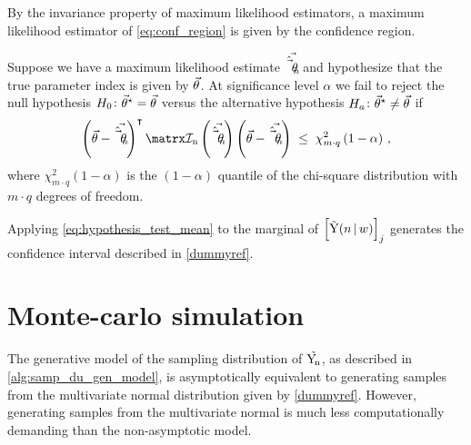 \documentclass[../main.tex]{subfiles}
\begin{document}
By the invariance property of maximum likelihood estimators, a maximum likelihood estimator of \cref{eq:conf_region} is given by the confidence region.
\begin{definition}
Suppose we have a maximum likelihood estimate $\vec{\hat{\vec{\theta}}_{n}}$ and hypothesize that the true parameter index is given by $\vec{\theta}$. At significance level $\alpha$ we fail to reject the null hypothesis $H_0 \colon {\vec{\theta}}^{\star} = \vec{\theta}$ versus the alternative hypothesis $H_a \colon {\vec{\theta}}^{\star} \neq \vec{\theta}$ if
\begin{equation}
\label{eq:hypothesis_test_mean}
    \left(\sysparamvec - \mleu\right)^\intercal \infomatrxn\left(\mleu\right) \left(\sysparamvec - \mleu\right) \;\leq\; \chi_{m \cdot q}^{2} \left(1-\alpha\right)\,,
\end{equation}
where $\chi_{m \cdot q}^2(1 - \alpha)$ is the $(1 - \alpha)$ quantile of the chi-square distribution with $m \cdot q$ degrees of freedom.
\end{definition}

Applying \cref{eq:hypothesis_test_mean} to the marginal of 
$\left[\mathrm{\vec{Y}}(n {\,|\,} w)\right]_j$ generates the confidence interval described in 
\cref{dummyref}.

\section{Monte-carlo simulation}
\label{sec:app:monte_carlo}
The generative model of the sampling distribution of $\mathrm{\vec{Y_{\!n}}}$, as described in 
\cref{alg:samp_du_gen_model}, is asymptotically equivalent to generating 
samples from the multivariate normal distribution given by \cref{dummyref}. 
However, generating samples from the multivariate normal is much less 
computationally demanding than the non-asymptotic model.
\end{document}
